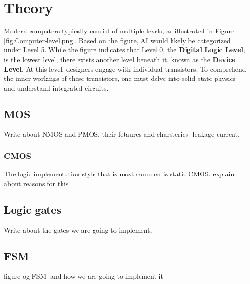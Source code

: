 \section{Theory}

Modern computers typically consist of multiple levels\cite[Page 2]{tanenbaum_2012_structured}, as illustrated in Figure \ref{fig:Computer-level.png}. Based on the figure, AI would likely be categorized under Level 5. While the figure indicates that Level 0, the \textbf{Digital Logic Level}, is the lowest level, there exists another level beneath it, known as the \textbf{Device Level}. At this level, designers engage with individual transistors. To comprehend the inner workings of these transistors, one must delve into solid-state physics and understand integrated circuits.
\subsection{MOS}

Write about NMOS and PMOS, their fetaures and charsterics
-leakage current.
\subsubsection{CMOS}

The logic implementation style that is most common is static CMOS.
explain about reasons for this

\subsection{Logic gates}
Write about the gates we are going to implement, 

\subsection{FSM}
figure og FSM, and how we are going to implement it 

